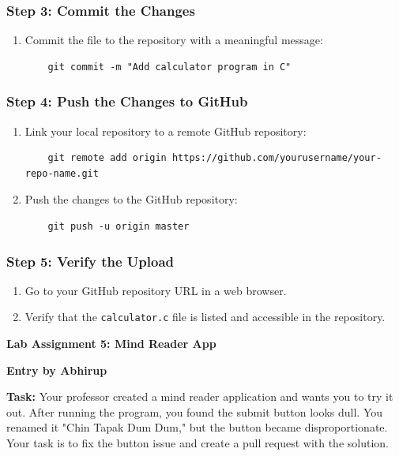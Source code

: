 \documentclass{article}
\begin{document}
\subsubsection{Step 3: Commit the Changes}
\begin{enumerate}
    \item Commit the file to the repository with a meaningful message:
    \begin{verbatim}
    git commit -m "Add calculator program in C"
    \end{verbatim}
\end{enumerate}

\subsubsection{Step 4: Push the Changes to GitHub}
\begin{enumerate}
    \item Link your local repository to a remote GitHub repository:
    \begin{verbatim}
    git remote add origin https://github.com/yourusername/your-repo-name.git
    \end{verbatim}
    \item Push the changes to the GitHub repository:
    \begin{verbatim}
    git push -u origin master
    \end{verbatim}
\end{enumerate}

\subsubsection{Step 5: Verify the Upload}
\begin{enumerate}
    \item Go to your GitHub repository URL in a web browser.
    \item Verify that the \texttt{calculator.c} file is listed and accessible in the repository.
\end{enumerate}


\newpage
\textbf{Lab Assignment 5: Mind Reader App}

\begin{center}
    \textbf{Entry by Abhirup}
\end{center}


\textbf{Task:} Your professor created a mind reader application and wants you to try it out. After running the program, you found the submit button looks dull. You renamed it "Chin Tapak Dum Dum," but the button became disproportionate. Your task is to fix the button issue and create a pull request with the solution.
\end{document}
